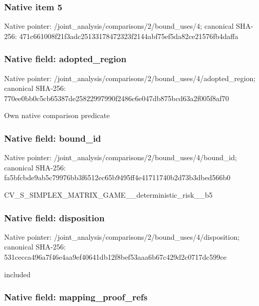 \documentclass[10pt,a4paper]{article}
\begin{document}
\subsubsection{Native item 5}


Native pointer: /joint\_analysis/comparis\allowbreak{}ons/2/bound\_uses/4; canonical SHA-256: 471c661008f21f3adc251331\allowbreak{}78472323f2144abf75ef5da8\allowbreak{}2ce21576fb4daffa



\subsubsection{Native field: adopted\_region}


Native pointer: /joint\_analysis/comparis\allowbreak{}ons/2/bound\_uses/4/adopt\allowbreak{}ed\_region; canonical SHA-256: 770ee0bb0c5cb65387de2582\allowbreak{}2997990f2486c6e047db875b\allowbreak{}cd63a2f005f8af70


Own native comparison predicate


\subsubsection{Native field: bound\_id}


Native pointer: /joint\_analysis/comparis\allowbreak{}ons/2/bound\_uses/4/bound\allowbreak{}\_id; canonical SHA-256: fa5bfcbde9ab5c79976bb3f6\allowbreak{}512ec65b9495ff4e41711740\allowbreak{}b2d73b3dbed566b0


CV\_S\_SIMPLEX\_MATRIX\_GAME\allowbreak{}\_\_deterministic\_risk\_\_b5


\subsubsection{Native field: disposition}


Native pointer: /joint\_analysis/comparis\allowbreak{}ons/2/bound\_uses/4/dispo\allowbreak{}sition; canonical SHA-256: 531cecca496a7f46e4aa9ef4\allowbreak{}0641db12f8bef53aaa6b67c4\allowbreak{}29d2c0717dc599ce


included


\subsubsection{Native field: mapping\_proof\_refs}
\end{document}
